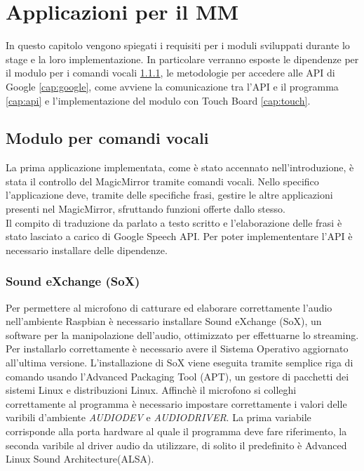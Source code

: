 \chapter{Applicazioni per il MM}\label{capitolo4}
In questo capitolo vengono spiegati i requisiti per i moduli sviluppati durante lo stage e la loro implementazione.
In particolare verranno esposte le dipendenze per il modulo per i comandi vocali \ref{cap:sox}, le metodologie
per accedere alle API di Google \ref{cap:google}, come avviene la comunicazione tra l'API e il programma \ref{cap:api}
e l'implementazione del modulo con Touch Board \ref{cap:touch}.

\section{Modulo per comandi vocali}\label{cap:voce}
La prima applicazione implementata, come \`e stato accennato nell'introduzione, \`e
stata il controllo del MagicMirror tramite comandi vocali.
Nello specifico l'applicazione deve, tramite delle specifiche frasi,
gestire le altre applicazioni presenti nel MagicMirror, sfruttando funzioni offerte dallo stesso.\\
Il compito di traduzione da parlato a testo scritto e l'elaborazione delle frasi \`e stato
lasciato a carico di Google Speech API.
Per poter implemententare l'API \`e necessario installare delle dipendenze.

\subsection{Sound eXchange (SoX)}\label{cap:sox}
Per permettere al microfono di catturare ed elaborare correttamente l'audio nell'ambiente
Raspbian \`e necessario installare Sound eXchange (SoX), un software per la manipolazione
dell'audio, ottimizzato per effettuarne lo streaming.
Per installarlo correttamente \`e necessario avere il Sistema Operativo aggiornato all'ultima versione.
L'installazione di SoX viene eseguita tramite semplice riga di comando usando l'Advanced Packaging Tool (APT),
un gestore di pacchetti dei sistemi Linux e distribuzioni Linux.
Affinch\`e il microfono si colleghi correttamente al programma \`e necessario impostare correttamente
i valori delle varibili d'ambiente \textit{AUDIODEV} e \textit{AUDIODRIVER}.
La prima variabile corrisponde alla porta hardware al quale il programma deve fare riferimento,
la seconda varibile al driver audio da utilizzare, di solito il predefinito \`e Advanced Linux Sound Architecture(ALSA).

